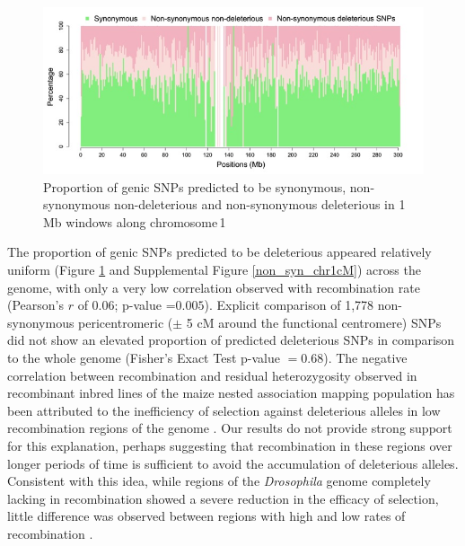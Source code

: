 \documentclass[12pt]{article}
\begin{document}
\begin{figure}[!t]
  \begin{center}
   \includegraphics[width=140mm]{PerDelGenome_ch1.jpg}
    \caption{Proportion of genic SNPs predicted to be synonymous, non-synonymous non-deleterious and non-synonymous deleterious in 1\,Mb windows along chromosome\,1} 
   \label{non_syn_chr1}
  \end{center}
\end{figure}

The proportion of genic SNPs predicted to be deleterious appeared relatively uniform (Figure \ref{non_syn_chr1} and  Supplemental Figure \ref{non_syn_chr1cM}) across the genome, with only a very low correlation  observed with recombination rate (Pearson's $r$ of 0.06; p-value =$0.005$).  Explicit comparison of 1,778 non-synonymous pericentromeric ($\pm$ 5 cM around the functional centromere) SNPs did not show an elevated proportion of predicted deleterious SNPs  in comparison to the whole genome (Fisher's Exact Test p-value $= 0.68$). 
The negative correlation between recombination and residual heterozygosity observed in recombinant inbred lines of the maize nested association mapping population has been attributed to the inefficiency of selection against deleterious alleles in low recombination regions of the genome \citep{McMullen2009,Gore2009}. 
Our results do not provide strong support for this explanation, perhaps suggesting that recombination in these regions over longer periods of time is sufficient to avoid the accumulation of deleterious alleles. Consistent with this idea, while regions of the \emph{Drosophila} genome completely lacking in recombination showed a severe reduction in the efficacy of selection, little difference was observed between regions with high and low rates of recombination \citep{Haddrill2007}.
\end{document}
